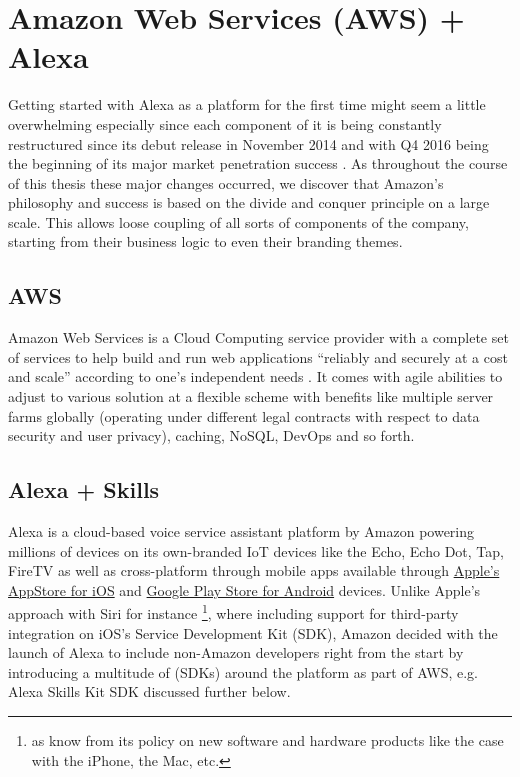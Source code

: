 \section[Amazon Web Services + Alexa]{Amazon Web Services (AWS) + Alexa}


Getting started with Alexa as a platform for the first time might seem a little overwhelming especially since each component of it is being  constantly restructured since its debut release in November 2014 and with Q4 2016 being the beginning of its major market penetration success \cite{gartnerpreds17}. %
As throughout the course of this thesis these major changes occurred, we discover that Amazon's philosophy and success is based on the divide and conquer principle on  a large scale. This allows loose coupling of all sorts of components of the company, starting from their business logic to even their branding themes. %
 

\subsection*{AWS}
Amazon Web Services is a Cloud Computing service provider with a complete set of services to help build and run web applications ``reliably and securely at a cost and scale'' according to one's independent needs \cite{aws_website}.
It comes with agile abilities to adjust to various solution at a flexible scheme with benefits like multiple server farms globally (operating under different legal contracts with respect to data security and user privacy), caching, NoSQL, DevOps and so forth.


\subsection*{Alexa + Skills}
\label{alexa:def}
Alexa is a cloud-based voice service assistant platform by Amazon powering millions of devices  on its own-branded IoT devices like the Echo, Echo Dot, Tap, FireTV as well as cross-platform through mobile apps available through  \href{https://itunes.apple.com/de/app/amazon-alexa/id944011620?l=en&mt=8}{Apple's AppStore for iOS} and  \href{https://play.google.com/store/apps/details?id=com.amazon.dee.app&hl=en}{Google Play Store for Android} devices. Unlike Apple's approach with Siri for instance \footnote{as know from its policy on  new software and hardware products like the case with the iPhone, the Mac, etc.}, where including support for third-party integration on iOS's Service Development Kit (SDK), Amazon decided with the launch of Alexa to include non-Amazon developers right from the start by introducing a multitude of (SDKs) around the platform as part of AWS, e.g. Alexa Skills Kit SDK discussed further below.

